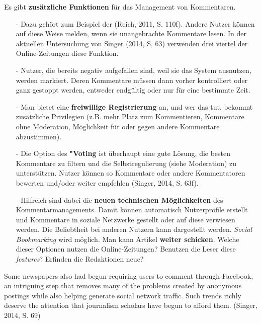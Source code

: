 Es gibt {\bfseries zusätzliche  Funktionen} für das Management von Kommentaren. 
\begin{itemize}
\item[-] Dazu gehört zum Beispiel der  \grqq\- (Reich, 2011, S. 110f). Andere Nutzer können auf diese Weise melden, wenn sie unangebrachte Kommentare lesen. In der aktuellen Untersuchung von Singer (2014, S. 63) verwenden drei viertel der Online-Zeitungen diese Funktion.  
\item[-] Nutzer, die bereits negativ aufgefallen sind, weil sie das System ausnutzen, werden markiert. Deren Kommentare müssen dann vorher kontrolliert oder ganz gestoppt werden, entweder endgültig oder nur für eine bestimmte Zeit. 
\item[-] Man bietet eine  {\bfseries freiwillige Registrierung} an, und wer das tut, bekommt zusätzliche Privilegien (z.B. mehr Platz zum Kommentieren, Kommentare ohne Moderation, Möglichkeit für oder gegen andere Kommentare abzustimmen). 
\item[-] Die Option des  {\bfseries "Voting\grqq} ist überhaupt eine gute Lösung, die besten Kommentare zu filtern und die Selbstregulierung (siehe Moderation) zu unterstützen. Nutzer können so Kommentare oder andere Kommentatoren bewerten und/oder weiter empfehlen (Singer, 2014, S. 63f).
 \item[-] Hilfreich sind dabei die {\bfseries neuen technischen Möglichkeiten} des Kommentarmanagements. Damit können
	 automatisch Nutzerprofile erstellt und Kommentare in soziale Netzwerke gestellt oder auf diese verwiesen
	 werden. Die Beliebtheit bei anderen Nutzern kann dargestellt werden. {\slshape Social Bookmarking} wird
	 möglich. Man kann Artikel  {\bfseries weiter schicken}. Welche dieser Optionen nutzen die Online-Zeitungen? Benutzen die Leser diese {\slshape features}? Erfinden die Redaktionen neue?

\end{itemize}


Some newspapers also had begun requiring users to
comment through Facebook, an intriguing step that removes many of the problems created
by anonymous postings while also helping generate social network traffic. Such
trends richly deserve the attention that journalism scholars have begun to afford them.
(Singer, 2014, S. 69)




